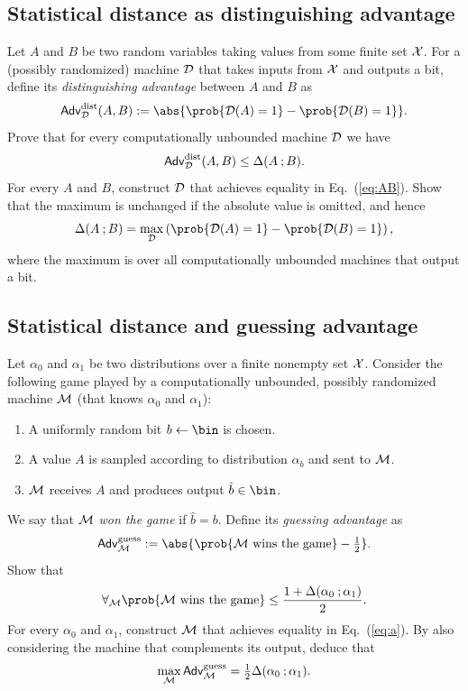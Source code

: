 \documentclass{llncs}
\begin{document}
\subsection{Statistical distance as distinguishing advantage}\label{ex:distinguishing}
Let $A$ and $B$ be two random variables taking values from some finite set ${\mathcal X}$. For a (possibly randomized) machine ${\mathcal D}$ that takes inputs from ${\mathcal X}$ and outputs a bit, define its \emph{distinguishing advantage} between $A$ and $B$ as
\[
    \advntg^{\mathrm{dist}}_{\cD}(A,B) := \abs{\prob{\cD(A) = 1} - \prob{\cD(B) = 1}}.
\]
Prove that for every computationally unbounded machine ${\mathcal D}$ we have
\begin{equation}\label{eq:AB}
    \mathsf{Adv}^{\mathrm{dist}}_{{\mathcal D}}(A,B) \leq \Delta(A \: ; B).
\end{equation}
For every $A$ and $B$, construct ${\mathcal D}$ that achieves equality in Eq.~(\ref{eq:AB}). Show that the maximum is unchanged if the absolute value is omitted, and hence
\[
    \SD{A}{B} = \max_{\cD}\left(\prob{\cD(A) = 1} - \prob{\cD(B) = 1}\right),
\]
where the maximum is over all computationally unbounded machines that output a bit.

\subsection{Statistical distance and guessing advantage}\label{ex:game}
Let $\alpha_0$ and $\alpha_1$ be two distributions over a finite nonempty set ${\mathcal X}$. Consider the following game played by a computationally unbounded, possibly randomized machine ${\mathcal M}$ (that knows $\alpha_0$ and $\alpha_1$):
\begin{enumerate}
		\item A uniformly random bit $b \leftarrow \bin$ is chosen.
		\item A value $A$ is sampled according to distribution $\alpha_b$ and sent to ${\mathcal M}$.
		\item ${\mathcal M}$ receives $A$ and produces output $\hat b \in \bin$.
\end{enumerate}
We say that ${\mathcal M}$ \emph{won the game} if $\hat b = b$. Define its \emph{guessing advantage} as
\[
    \advntg^{\mathrm{guess}}_{\cM} := \abs{\prob{\cM\mbox{\ wins the game}} - \half}.
\]
Show that
\begin{equation}\label{eq:a}
	\forall_\cM \prob{\cM\mbox{\ wins the game}} \leq \frac{1 + \SD{\alpha_0}{\alpha_1}}{2}.
\end{equation}
For every $\alpha_0$ and $\alpha_1$, construct ${\mathcal M}$ that achieves equality in Eq.~(\ref{eq:a}). By also considering the machine that complements its output, deduce that
\[
    \max_{{\mathcal M}}\mathsf{Adv}^{\mathrm{guess}}_{{\mathcal M}} = {\textstyle\frac{1}{2}}\Delta(\alpha_0 \: ; \alpha_1).
\]
\end{document}
